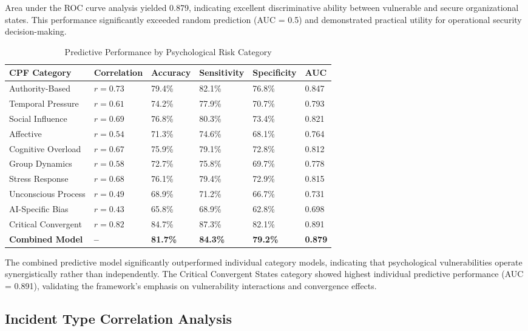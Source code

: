 \documentclass[10pt, twocolumn]{article}
\begin{document}
Area under the ROC curve analysis yielded 0.879, indicating excellent discriminative ability between vulnerable and secure organizational states. This performance significantly exceeded random prediction (AUC = 0.5) and demonstrated practical utility for operational security decision-making.

\begin{table*}[t]
\caption{Predictive Performance by Psychological Risk Category}
\label{tab:predictive_performance}
\centering
\begin{tabular}{@{}l l l l l l@{}}
\toprule
\textbf{CPF Category} & \textbf{Correlation} & \textbf{Accuracy} & \textbf{Sensitivity} & \textbf{Specificity} & \textbf{AUC} \\
\midrule
Authority-Based & $r = 0.73$ & 79.4\% & 82.1\% & 76.8\% & 0.847 \\
Temporal Pressure & $r = 0.61$ & 74.2\% & 77.9\% & 70.7\% & 0.793 \\
Social Influence & $r = 0.69$ & 76.8\% & 80.3\% & 73.4\% & 0.821 \\
Affective & $r = 0.54$ & 71.3\% & 74.6\% & 68.1\% & 0.764 \\
Cognitive Overload & $r = 0.67$ & 75.9\% & 79.1\% & 72.8\% & 0.812 \\
Group Dynamics & $r = 0.58$ & 72.7\% & 75.8\% & 69.7\% & 0.778 \\
Stress Response & $r = 0.68$ & 76.1\% & 79.4\% & 72.9\% & 0.815 \\
Unconscious Process & $r = 0.49$ & 68.9\% & 71.2\% & 66.7\% & 0.731 \\
AI-Specific Bias & $r = 0.43$ & 65.8\% & 68.9\% & 62.8\% & 0.698 \\
Critical Convergent & $r = 0.82$ & 84.7\% & 87.3\% & 82.1\% & 0.891 \\
\midrule
\textbf{Combined Model} & \textbf{--} & \textbf{81.7\%} & \textbf{84.3\%} & \textbf{79.2\%} & \textbf{0.879} \\
\bottomrule
\end{tabular}
\end{table*}

The combined predictive model significantly outperformed individual category models, indicating that psychological vulnerabilities operate synergistically rather than independently. The Critical Convergent States category showed highest individual predictive performance (AUC = 0.891), validating the framework's emphasis on vulnerability interactions and convergence effects.

\subsection{Incident Type Correlation Analysis}
\end{document}
